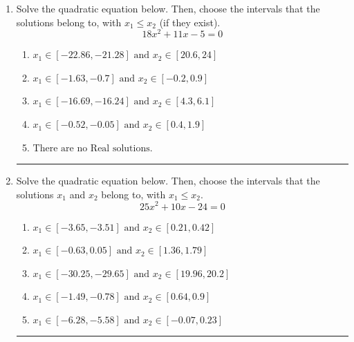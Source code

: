\documentclass[14pt]{extbook}
\newcommand{\litem}[1]{\item#1\hspace*{-1cm}\rule{\textwidth}{0.4pt}}
\begin{document}
\begin{enumerate}
{\begin{enumerate}[label=\Alph*.]
\end{enumerate} }
\litem{
Solve the quadratic equation below. Then, choose the intervals that the solutions belong to, with $x_1 \leq x_2$ (if they exist).\[ 18x^{2} +11 x -5 = 0 \]\begin{enumerate}[label=\Alph*.]
\item \( x_1 \in [-22.86, -21.28] \text{ and } x_2 \in [20.6, 24] \)
\item \( x_1 \in [-1.63, -0.7] \text{ and } x_2 \in [-0.2, 0.9] \)
\item \( x_1 \in [-16.69, -16.24] \text{ and } x_2 \in [4.3, 6.1] \)
\item \( x_1 \in [-0.52, -0.05] \text{ and } x_2 \in [0.4, 1.9] \)
\item \( \text{There are no Real solutions.} \)

\end{enumerate} }
\litem{
Solve the quadratic equation below. Then, choose the intervals that the solutions $x_1$ and $x_2$ belong to, with $x_1 \leq x_2$.\[ 25x^{2} +10 x -24 = 0 \]\begin{enumerate}[label=\Alph*.]
\item \( x_1 \in [-3.65, -3.51] \text{ and } x_2 \in [0.21, 0.42] \)
\item \( x_1 \in [-0.63, 0.05] \text{ and } x_2 \in [1.36, 1.79] \)
\item \( x_1 \in [-30.25, -29.65] \text{ and } x_2 \in [19.96, 20.2] \)
\item \( x_1 \in [-1.49, -0.78] \text{ and } x_2 \in [0.64, 0.9] \)
\item \( x_1 \in [-6.28, -5.58] \text{ and } x_2 \in [-0.07, 0.23] \)


\end{enumerate}}
\end{enumerate}
\end{document}
